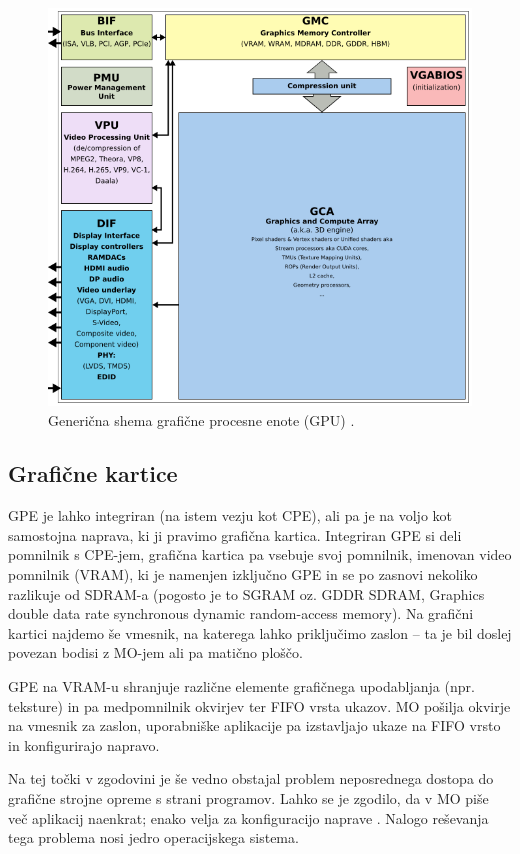 \documentclass{article}
\begin{document}
\begin{figure}[H]
    \centering
    \includegraphics[width=0.75\linewidth]{Generic_block_diagram_of_a_GPU}
    \caption{Generična shema grafične procesne enote (GPU) \autocite{fig:genericgpu}.}
\end{figure}

\subsection{Grafične kartice}
GPE je lahko integriran (na istem vezju kot CPE), ali pa je na voljo kot samostojna naprava, ki ji pravimo grafična kartica. Integriran GPE si deli pomnilnik s CPE-jem, grafična kartica pa vsebuje svoj pomnilnik, imenovan video pomnilnik (VRAM), ki je namenjen izključno GPE in se po zasnovi nekoliko razlikuje od SDRAM-a (pogosto je to SGRAM oz. GDDR SDRAM, Graphics double data rate synchronous dynamic random-access memory). Na grafični kartici najdemo še vmesnik, na katerega lahko priključimo zaslon -- ta je bil doslej povezan bodisi z MO-jem ali pa matično ploščo.

GPE na VRAM-u shranjuje različne elemente grafičnega upodabljanja (npr. teksture) \autocite{cornell} in pa medpomnilnik okvirjev ter FIFO vrsta ukazov. MO pošilja okvirje na vmesnik za zaslon, uporabniške aplikacije pa izstavljajo ukaze na FIFO vrsto in konfigurirajo napravo.

Na tej točki v zgodovini je še vedno obstajal problem neposrednega dostopa do grafične strojne opreme s strani programov. Lahko se je zgodilo, da v MO piše več aplikacij naenkrat; enako velja za konfiguracijo naprave \autocite{sdram}. Nalogo reševanja tega problema nosi jedro operacijskega sistema.
\end{document}
